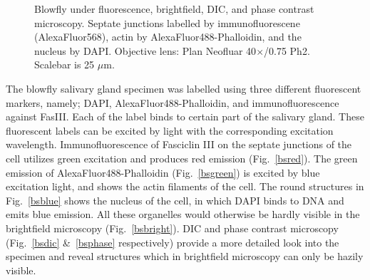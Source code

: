 \begin{figure}[h]
 \hspace{0.1mm}
\caption{Blowfly under fluorescence, brightfield, DIC, and phase contrast microscopy. 
Septate junctions labelled by immunofluorescene (AlexaFluor568), actin by AlexaFluor488-Phalloidin, and the nucleus by DAPI. 
Objective lens: Plan Neofluar 40$\times$/0.75 Ph2. 
Scalebar is 25 $\mu$m.} 
\label{fig:blow}
\end{figure}

The blowfly salivary gland specimen was labelled using three different fluorescent markers, namely; DAPI, AlexaFluor488-Phalloidin, and immunofluorescence against FasIII. 
Each of the label binds to certain part of the salivary gland. 
These fluorescent labels can be excited by light with the corresponding excitation wavelength. 
Immunofluorescence of Fasciclin III on the septate junctions of the cell utilizes green excitation and produces red emission (Fig.~\ref{bsred}). 
The green emission of AlexaFluor488-Phalloidin (Fig.~\ref{bsgreen}) is excited by blue excitation light, and shows the actin filaments of the cell. 
The round structures in Fig.~\ref{bsblue} shows the nucleus of the cell, in which DAPI binds to DNA and emits blue emission. 
All these organelles would otherwise be hardly visible in the brightfield microscopy (Fig.~\ref{bsbright}). 
DIC and phase contrast microscopy (Fig.~\ref{bsdic} \&~\ref{bsphase} respectively) provide a more detailed look into the specimen and reveal structures which in brightfield microscopy can only be hazily visible.


